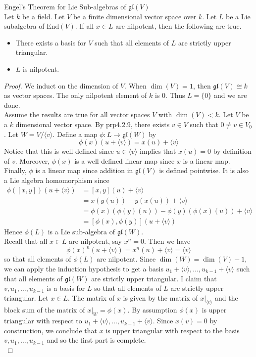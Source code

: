 \documentclass[a4paper]{article}
\begin{document}
\begin{prp}{Engel's Theorem for Lie Sub-algebras of $\mathfrak{gl}(V)$}{} \\Let $k$ be a field. Let $V$ be a finite dimensional vector space over $k$. Let $L$ be a Lie subalgebra of $\text{End}(V)$. If all $x\in L$ are nilpotent, then the following are true. 
\begin{itemize}
\item There exists a basis for $V$ such that all elements of $L$ are strictly upper triangular. 
\item $L$ is nilpotent. 
\end{itemize} 
\begin{proof}
We induct on the dimension of $V$. When $\dim(V)=1$, then $\mathfrak{gl}(V)\cong k$ as vector spaces. The only nilpotent element of $k$ is $0$. Thus $L=\{0\}$ and we are done. \\

Assume the results are true for all vector spaces $V$ with $\dim(V)<k$. Let $V$ be a $k$ dimensional vector space. By prp4.2.9, there exists $v\in V$ such that $0\neq v\in V_0$. Let $W=V/\langle v\rangle$. Define a map $\phi:L\to\mathfrak{gl}(W)$ by $$\phi(x)(u+\langle v\rangle)=x(u)+\langle v\rangle$$ Notice that this is well defined since $u\in\langle v\rangle$ implies that $x(u)=0$ by definition of $v$. Moreover, $\phi(x)$ is a well defined linear map since $x$ is a linear map. Finally, $\phi$ is a linear map since addition in $\mathfrak{gl}(V)$ is defined pointwise. It is also a Lie algebra homomorphism since 
\begin{align*}
\phi([x,y])(u+\langle v\rangle)&=[x,y](u)+\langle v\rangle\\
&=x(y(u))-y(x(u))+\langle v\rangle\\
&=\phi(x)(\phi(y)(u))-\phi(y)(\phi(x)(u))+\langle v\rangle\\
&=[\phi(x),\phi(y)](u+\langle v\rangle)
\end{align*}
Hence $\phi(L)$ is a Lie sub-algebra of $\mathfrak{gl}(W)$. \\

Recall that all $x\in L$ are nilpotent, say $x^n=0$. Then we have $$\phi(x)^n(u+\langle v\rangle)=x^n(u)+\langle v\rangle=\langle v\rangle$$ so that all elements of $\phi(L)$ are nilpotent. Since $\dim(W)=\dim(V)-1$, we can apply the induction hypothesis to get a basis $u_1+\langle v\rangle,\dots,u_{k-1}+\langle v\rangle$ such that all elements of $\mathfrak{gl}(W)$ are strictly upper triangular. I claim that $v,u_1,\dots,u_{k-1}$ is a basis for $L$ so that all elements of $L$ are strictly upper triangular. Let $x\in L$. The matrix of $x$ is given by the matrix of $x|_{\langle v\rangle}$ and the block sum of the matrix of $x|_W=\phi(x)$. By assumption $\phi(x)$ is upper triangular with respect to $u_1+\langle v\rangle,\dots,u_{k-1}+\langle v\rangle$. Since $x(v)=0$ by construction, we conclude that $x$ is upper triangular with respect to the basis $v,u_1,\dots,u_{k-1}$ and so the first part is complete. \\


\end{proof}
\end{prp}
\end{document}

